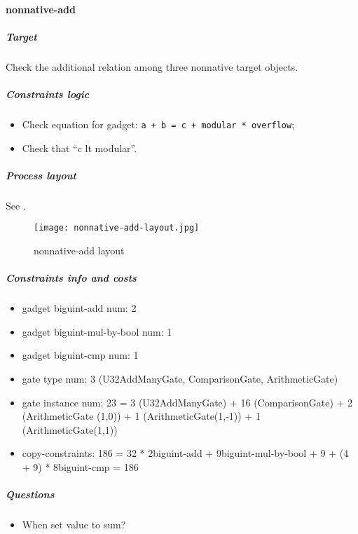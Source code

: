 \paragraph{nonnative-add}

\subparagraph{Target}
Check the additional relation among three nonnative target objects.

\subparagraph{Constraints logic}
\begin{itemize}
    \item Check equation for gadget: \verb|a + b = c + modular * overflow|;
    \item Check that ``c lt modular''.
\end{itemize}

\subparagraph{Process layout}
See .
\begin{figure}[!ht]
    \centering
    \texttt{[image: nonnative-add-layout.jpg]}
    \caption{nonnative-add layout}
    \label{fig:nonnative-add-layout}
\end{figure}

\subparagraph{Constraints info and costs}
\begin{itemize}
    \item gadget biguint-add num: 2
    \item gadget biguint-mul-by-bool num: 1
    \item gadget biguint-cmp num: 1
    \item gate type num: 3 (U32AddManyGate, ComparisonGate, ArithmeticGate)
    \item gate instance num: 23 = 3 (U32AddManyGate) + 16 (ComparisonGate) + 2 (ArithmeticGate (1,0)) + 1 (ArithmeticGate(1,-1)) + 1 (ArithmeticGate(1,1))
    \item copy-constraints: 186 = 32 * 2{biguint-add} + 9{biguint-mul-by-bool} + 9 + (4 + 9) * 8{biguint-cmp} = 186
\end{itemize}

\subparagraph{Questions}
\begin{itemize}
    \item When set value to sum?
\end{itemize}
